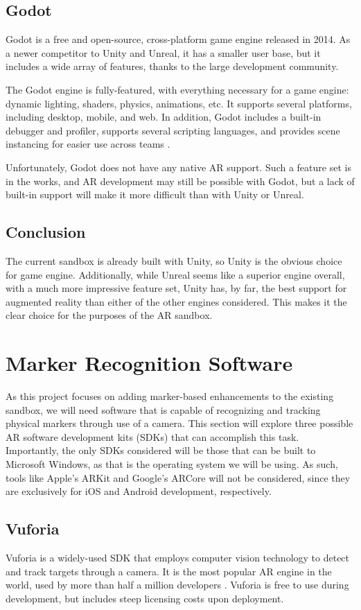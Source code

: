 \documentclass[letterpaper, 10pt, onecolumn, draftclsnofoot]{IEEEtran}
\begin{document}
\subsection{Godot}
Godot is a free and open-source, cross-platform game engine released in 2014. As a newer competitor to Unity and Unreal, it has a smaller user base, but it includes a wide array of features, thanks to the large development community.

The Godot engine is fully-featured, with everything necessary for a game engine: dynamic lighting, shaders, physics, animations, etc. It supports several platforms, including desktop, mobile, and web. In addition, Godot includes a built-in debugger and profiler, supports several scripting languages, and provides scene instancing for easier use across teams \cite{godot-features}.

Unfortunately, Godot does not have any native AR support. Such a feature set is in the works, and AR development may still be possible with Godot, but a lack of built-in support will make it more difficult than with Unity or Unreal.

\subsection{Conclusion}
The current sandbox is already built with Unity, so Unity is the obvious choice for game engine. Additionally, while Unreal seems like a superior engine overall, with a much more impressive feature set, Unity has, by far, the best support for augmented reality than either of the other engines considered. This makes it the clear choice for the purposes of the AR sandbox.

\section{Marker Recognition Software}
As this project focuses on adding marker-based enhancements to the existing sandbox, we will need software that is capable of recognizing and tracking physical markers through use of a camera. This section will explore three possible AR software development kits (SDKs) that can accomplish this task. Importantly, the only SDKs considered will be those that can be built to Microsoft Windows, as that is the operating system we will be using. As such, tools like Apple's ARKit and Google's ARCore will not be considered, since they are exclusively for iOS and Android development, respectively.

\subsection{Vuforia}
Vuforia is a widely-used SDK that employs computer vision technology to detect and track targets through a camera. It is the most popular AR engine in the world, used by more than half a million developers \cite{vuforia-engine}. Vuforia is free to use during development, but includes steep licensing costs upon deployment. 
\end{document}
